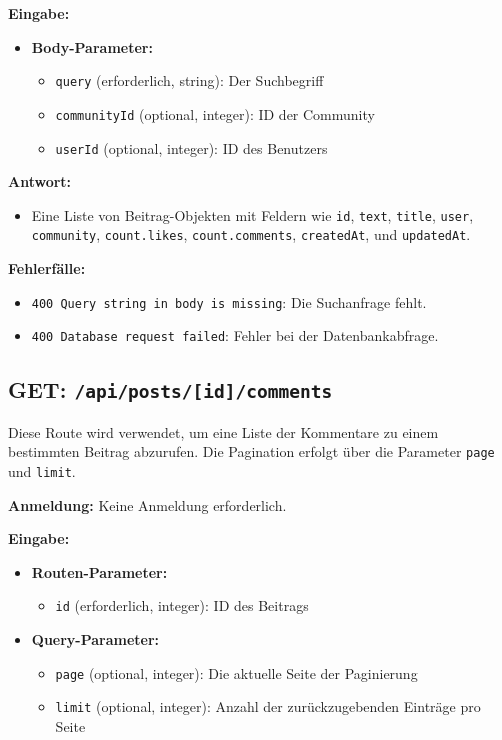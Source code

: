 \documentclass[a4paper,12pt]{article}
\begin{document}
\textbf{Eingabe:}
\begin{itemize}
    \item \textbf{Body-Parameter:}
    \begin{itemize}
        \item \texttt{query} (erforderlich, string):
            Der Suchbegriff
        \item \texttt{communityId} (optional, integer):
            ID der Community
        \item \texttt{userId} (optional, integer):
            ID des Benutzers
    \end{itemize}
\end{itemize}

\textbf{Antwort:}
\begin{itemize}
    \item Eine Liste von Beitrag-Objekten mit Feldern wie
        \texttt{id},
        \texttt{text},
        \texttt{title},
        \texttt{user},
        \texttt{community},
        \texttt{count.likes},
        \texttt{count.comments},
        \texttt{createdAt},
        und \texttt{updatedAt}.
\end{itemize}

\textbf{Fehlerfälle:}
\begin{itemize}
    \item \texttt{400 Query string in body is missing}:
        Die Suchanfrage fehlt.
    \item \texttt{400 Database request failed}:
        Fehler bei der Datenbankabfrage.
\end{itemize}

\newpage
\subsection{GET: \texttt{/api/posts/[id]/comments}}

Diese Route wird verwendet, um eine Liste der Kommentare zu einem bestimmten
Beitrag abzurufen. Die Pagination erfolgt über die Parameter \texttt{page} und
\texttt{limit}.

\textbf{Anmeldung:} Keine Anmeldung erforderlich.

\textbf{Eingabe:}
\begin{itemize}
    \item \textbf{Routen-Parameter:}
    \begin{itemize}
        \item \texttt{id} (erforderlich, integer): ID des Beitrags
    \end{itemize}
    \item \textbf{Query-Parameter:}
    \begin{itemize}
        \item \texttt{page} (optional, integer):
            Die aktuelle Seite der Paginierung
        \item \texttt{limit} (optional, integer):
            Anzahl der zurückzugebenden Einträge pro Seite
    \end{itemize}
\end{itemize}
\end{document}
